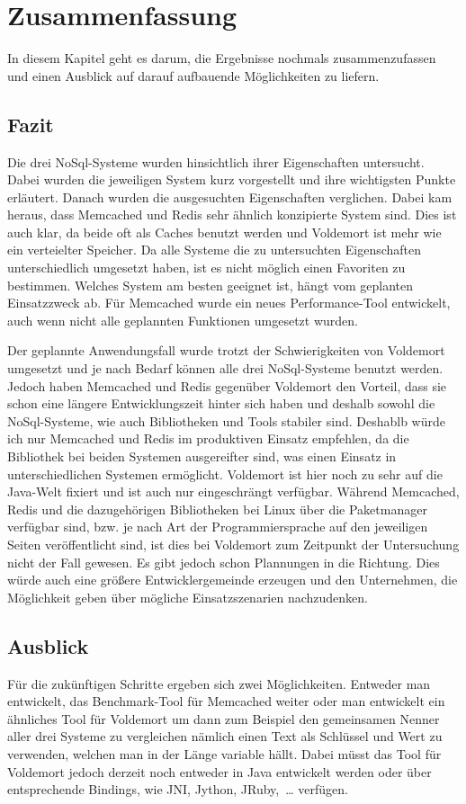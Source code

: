 \chapter{Zusammenfassung}
In diesem Kapitel geht es darum, die Ergebnisse nochmals zusammenzufassen und
einen Ausblick auf darauf aufbauende Möglichkeiten zu liefern.

\section{Fazit}
Die drei NoSql-Systeme wurden hinsichtlich ihrer Eigenschaften untersucht.
Dabei wurden die jeweiligen System kurz vorgestellt und ihre wichtigsten Punkte
erläutert. Danach wurden die ausgesuchten Eigenschaften verglichen. Dabei kam
heraus, dass Memcached und Redis sehr ähnlich konzipierte System sind. Dies ist
auch klar, da beide oft als Caches benutzt werden und Voldemort ist mehr wie
ein verteielter Speicher. Da alle Systeme die zu untersuchten Eigenschaften
unterschiedlich umgesetzt haben, ist es nicht möglich einen Favoriten zu
bestimmen. Welches System am besten geeignet ist, hängt vom geplanten
Einsatzzweck ab. Für Memcached wurde ein neues Performance-Tool entwickelt,
auch wenn nicht alle geplannten Funktionen umgesetzt wurden.

Der geplannte Anwendungsfall wurde trotzt der Schwierigkeiten von Voldemort
umgesetzt und je nach Bedarf können alle drei NoSql-Systeme benutzt werden.
Jedoch haben Memcached und Redis gegenüber Voldemort den Vorteil, dass sie schon
eine längere Entwicklungszeit hinter sich haben und deshalb sowohl die
NoSql-Systeme, wie auch Bibliotheken und Tools stabiler sind. Deshablb würde
ich nur Memcached und Redis im produktiven Einsatz empfehlen, da die Bibliothek
bei beiden Systemen ausgereifter sind, was einen Einsatz in unterschiedlichen
Systemen ermöglicht. Voldemort ist hier noch zu sehr auf die Java-Welt fixiert
und ist auch nur eingeschrängt verfügbar. Während Memcached, Redis und die
dazugehörigen Bibliotheken bei Linux über die Paketmanager verfügbar sind, bzw.
je nach Art der Programmiersprache auf den jeweiligen Seiten veröffentlicht sind,
ist dies bei Voldemort zum Zeitpunkt der Untersuchung nicht der Fall gewesen.
Es gibt jedoch schon Plannungen in die Richtung. Dies würde auch eine größere
Entwicklergemeinde erzeugen und den Unternehmen, die Möglichkeit geben über
mögliche Einsatzszenarien nachzudenken.

\section{Ausblick}
Für die zukünftigen Schritte ergeben sich zwei Möglichkeiten. Entweder man
entwickelt, das Benchmark-Tool für Memcached weiter oder man entwickelt ein
ähnliches Tool für Voldemort um dann zum Beispiel den gemeinsamen Nenner aller
drei Systeme zu vergleichen nämlich einen Text als Schlüssel und Wert zu
verwenden, welchen man in der Länge variable hällt. Dabei müsst das Tool für
Voldemort jedoch derzeit noch entweder in Java entwickelt werden oder über
entsprechende Bindings, wie \gls{JNI}, Jython, JRuby,~\dots{} verfügen.

